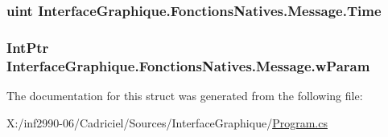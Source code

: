 \hypertarget{struct_interface_graphique_1_1_fonctions_natives_1_1_message_ae0ab10151482b01c9c5fe1cb4e8a2306}{
\subsubsection[{Time}]{\setlength{\rightskip}{0pt plus 5cm}uint Interface\-Graphique.\-Fonctions\-Natives.\-Message.\-Time}}\label{struct_interface_graphique_1_1_fonctions_natives_1_1_message_ae0ab10151482b01c9c5fe1cb4e8a2306}
\hypertarget{struct_interface_graphique_1_1_fonctions_natives_1_1_message_aa04705defc08a7fea09f90b1cd069e20}{
\subsubsection[{w\-Param}]{\setlength{\rightskip}{0pt plus 5cm}Int\-Ptr Interface\-Graphique.\-Fonctions\-Natives.\-Message.\-w\-Param}}\label{struct_interface_graphique_1_1_fonctions_natives_1_1_message_aa04705defc08a7fea09f90b1cd069e20}


The documentation for this struct was generated from the following file\-:\begin{DoxyCompactItemize}
\item 
X\-:/inf2990-\/06/\-Cadriciel/\-Sources/\-Interface\-Graphique/\hyperlink{_program_8cs}{Program.\-cs}\end{DoxyCompactItemize}
